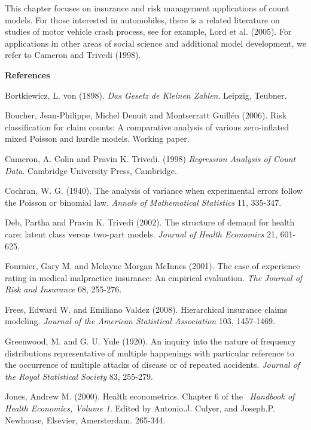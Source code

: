 {This chapter focuses on insurance and risk management applications
of count models. For those interested in automobiles, there is a
related literature on studies of motor vehicle crash process, see
for example, Lord et al. (2005). For applications in other areas of
social science and additional model development, we refer to Cameron
and Trivedi (1998).

\bigskip

\textbf{References}



\begin{multicols}{2}

Bortkiewicz, L. von (1898). \textit{Das Gesetz de Kleinen Zahlen}.
Leipzig, Teubner.

Boucher, Jean-Philippe, Michel Denuit and Montserratt Guill\'{e}n
(2006). Risk classification for claim counts: A comparative analysis
of various zero-inflated mixed Poisson and hurdle models. Working
paper.

Cameron, A. Colin and Pravin K. Trivedi. (1998) \textit{Regression Analysis
of Count Data}. Cambridge University Press, Cambridge.

Cochran, W. G. (1940). The analysis of variance when experimental
errors follow the Poisson or binomial law. \textit{Annals of
Mathematical Statistics} 11, 335-347.

Deb, Partha and Pravin K. Trivedi (2002). The structure of demand for health
care: latent class versus two-part models. \textit{Journal of Health
Economics} 21, 601-625.

Fournier, Gary M. and Melayne Morgan McInnes (2001). The case of
experience rating in medical malpractice insurance: An empirical
evaluation. \textit{The Journal of Risk and Insurance} 68, 255-276.

Frees, Edward W. and Emiliano Valdez (2008). Hierarchical insurance
claims modeling. \textit{Journal of the American Statistical
Association} 103, 1457-1469.

Greenwood, M. and G. U. Yule (1920). An inquiry into the nature of
frequency distributions representative of multiple happenings with
particular reference to the occurrence of multiple attacks of
disease or of repeated accidents. \textit{Journal of the Royal
Statistical Society} 83, 255-279.

Jones, Andrew M. (2000). Health econometrics. Chapter 6 of the\ \textit{%
Handbook of Health Economics, Volume 1}. Edited by Antonio.J. Culyer, and
Joseph.P. Newhouse, Elsevier, Amersterdam. 265-344.


\end{multicols}}
